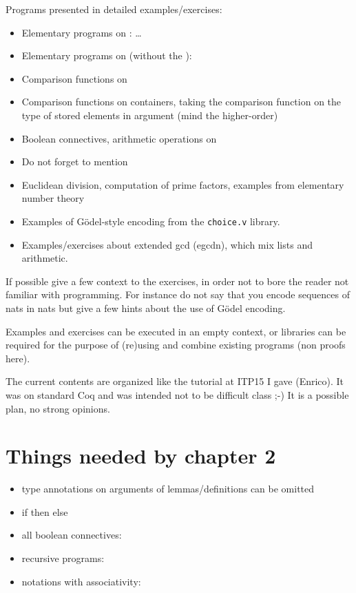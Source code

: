 Programs presented in detailed examples/exercises:
\begin{itemize}
\item Elementary programs on : \dots
\item Elementary programs on  (without the ):
\item Comparison functions on 
\item Comparison functions on containers, taking the comparison
  function on the type of stored elements in argument (mind the
  higher-order)
\item Boolean connectives, arithmetic operations on 
\item Do not forget to mention 
\item Euclidean division, computation of prime factors, examples from
  elementary number theory
\item Examples of G{\"o}del-style encoding from the {\tt choice.v} library.
\item Examples/exercises about extended gcd (egcdn), which mix lists
  and arithmetic.
\end{itemize}
If possible give a few context to the exercises, in order not to bore
the reader not familiar with programming. For instance do not say that
you encode sequences of nats in nats but give a few hints about the
use of G{\"o}del encoding.

Examples and exercises can be executed in an empty context, or
libraries can be required for the purpose of (re)using and combine existing
programs (non proofs here).

The current contents are organized like the tutorial at ITP15 I gave (Enrico).
It was on standard Coq and was intended not to be difficult class ;-)
It is a possible plan, no strong opinions.

\section*{Things needed by chapter 2}
\begin{itemize}
\item type annotations on arguments of lemmas/definitions can be omitted
\item if then else
\item all boolean connectives: 
\item recursive programs: 
\item notations with associativity: 
\end{itemize}


